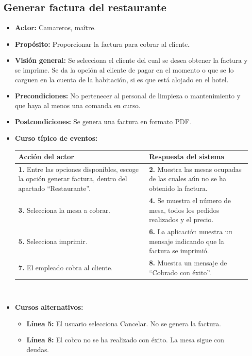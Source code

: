 \documentclass[spanish,a4paper,11pt, twoside]{report}	%
\begin{document}
		\subsection{Generar factura del restaurante}
			\begin{itemize}
			\item \textbf{Actor:} Camareros, maître.
			\item \textbf{Propósito: } Proporcionar la factura para cobrar al cliente.
			\item \textbf{Visión general:} Se selecciona el cliente del cual se desea obtener la factura y se imprime. Se da la opción al cliente de pagar en el momento o que se lo carguen en la cuenta de la habitación, si es que está alojado en el hotel.
			\item \textbf{Precondiciones:} No pertenecer al personal de limpieza o mantenimiento y que haya al menos una comanda en curso.
			\item \textbf{Postcondiciones:} Se genera una factura en formato PDF.
			\item \textbf{Curso típico de eventos:} 	\\
				\begin{tabular}{|p{6cm}||p{6cm}|}
				\hline
				\textbf{Acción del actor} & \textbf{Respuesta del sistema} \\ \hline \hline
				\textbf{1.} Entre las opciones disponibles, escoge la opción generar factura, 
					dentro del apartado ``Restaurante''. & 
				\textbf{2.} Muestra las mesas ocupadas de las cuales aún no se ha obtenido la factura. \\ \hline
				\textbf{3.} Selecciona la mesa a cobrar.	& 
				\textbf{4.} Se muestra el número de mesa, todos los pedidos realizados y el precio. \\ \hline
				\textbf{5.} Selecciona imprimir.	& 
				\textbf{6.} La aplicación muestra un mensaje indicando que la factura se imprimió. \\ \hline
				\textbf{7.} El empleado cobra al cliente.	& 
				\textbf{8.} Muestra un mensaje de ``Cobrado con éxito''. \\ \hline
			\end{tabular}
			\\
			\item \textbf{Cursos alternativos:} 
			\begin{itemize}
			\item  \textbf{Línea 5:} El usuario selecciona Cancelar. No se genera la factura.
			\item  \textbf{Línea 8:} El cobro no se ha realizado con éxito. La mesa sigue con deudas.
			\end {itemize}
		\end {itemize}
		
\end{document}
